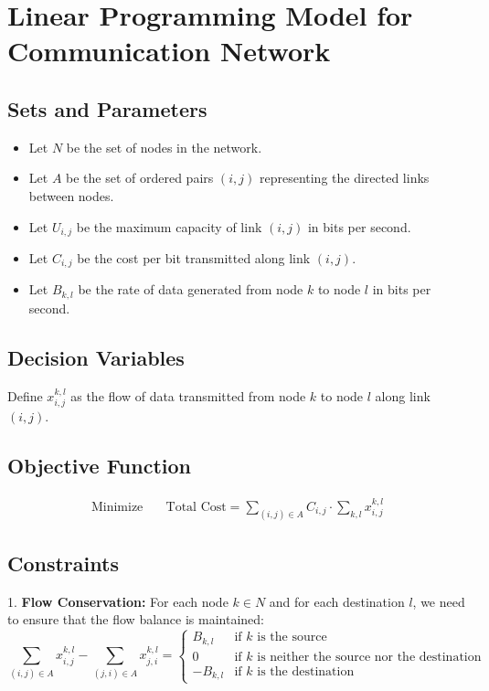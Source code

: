 \documentclass{article}
\begin{document}
\section*{Linear Programming Model for Communication Network}

\subsection*{Sets and Parameters}
\begin{itemize}
    \item Let $N$ be the set of nodes in the network.
    \item Let $A$ be the set of ordered pairs $(i, j)$ representing the directed links between nodes.
    \item Let $U_{i,j}$ be the maximum capacity of link $(i, j)$ in bits per second.
    \item Let $C_{i,j}$ be the cost per bit transmitted along link $(i, j)$.
    \item Let $B_{k,l}$ be the rate of data generated from node $k$ to node $l$ in bits per second.
\end{itemize}

\subsection*{Decision Variables}
Define $x_{i,j}^{k,l}$ as the flow of data transmitted from node $k$ to node $l$ along link $(i,j)$.

\subsection*{Objective Function}
\begin{align*}
\text{Minimize} \quad & \text{Total Cost} = \sum_{(i,j) \in A} C_{i,j} \cdot \sum_{k,l} x_{i,j}^{k,l}
\end{align*}

\subsection*{Constraints}
1. \textbf{Flow Conservation:} For each node $k \in N$ and for each destination $l$, we need to ensure that the flow balance is maintained:
\[
\sum_{(i,j) \in A} x_{i,j}^{k,l} - \sum_{(j,i) \in A} x_{j,i}^{k,l} = 
\begin{cases}
B_{k,l} & \text{if } k \text{ is the source} \\
0 & \text{if } k \text{ is neither the source nor the destination} \\
-B_{k,l} & \text{if } k \text{ is the destination}
\end{cases}
\]
\end{document}
